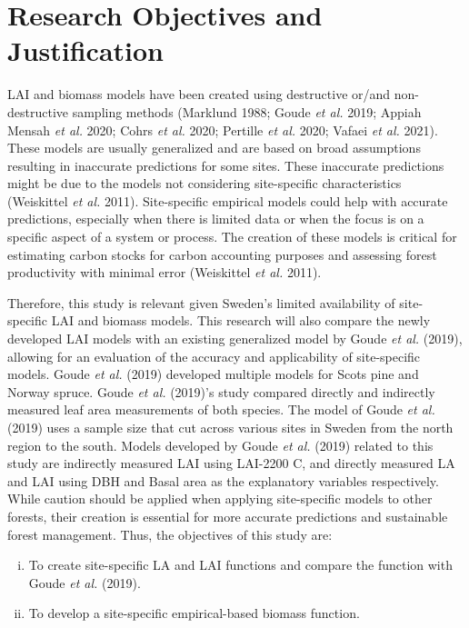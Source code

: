 \documentclass[11pt, a4paper]{report}
\begin{document}
\section{Research Objectives and Justification}
LAI and biomass models have been created using destructive or/and non-destructive sampling methods (Marklund 1988; Goude \textit{et al.} 2019; Appiah Mensah \textit{et al.} 2020; Cohrs \textit{et al.} 2020; Pertille \textit{et al.} 2020; Vafaei \textit{et al.} 2021). These models are usually generalized and are based on broad assumptions resulting in inaccurate predictions for some sites. These inaccurate predictions might be due to the models not considering site-specific characteristics (Weiskittel \textit{et al.} 2011). Site-specific empirical models could help with accurate predictions, especially when there is limited data or when the focus is on a specific aspect of a system or process. The creation of these models is critical for estimating carbon stocks for carbon accounting purposes and assessing forest productivity with minimal error (Weiskittel \textit{et al.} 2011). 

Therefore, this study is relevant given Sweden’s limited availability of site- specific LAI and biomass models. This research will also compare the newly developed LAI models with an existing generalized model by Goude \textit{et al.} (2019), allowing for an evaluation of the accuracy and applicability of site-specific models. Goude \textit{et al.} (2019) developed multiple models for Scots pine and Norway spruce. Goude \textit{et al.} (2019)’s study compared directly and indirectly measured leaf area measurements of both species. The model of Goude \textit{et al.} (2019) uses a sample size that cut across various sites in Sweden from the north region to the south. Models developed by Goude \textit{et al.} (2019) related to this study are indirectly measured LAI using LAI-2200 C, and directly measured LA and LAI using DBH and Basal area as the explanatory variables respectively. While caution should be applied when applying site-specific models to other forests, their creation is essential for more accurate predictions and sustainable forest management. Thus, the objectives of this study are: 
\begin{enumerate}[i.]
\item To create site-specific LA and LAI functions and compare the function with Goude \textit{et al.} (2019). 
\item To develop a site-specific empirical-based biomass function.
\end{enumerate}
\end{document}

